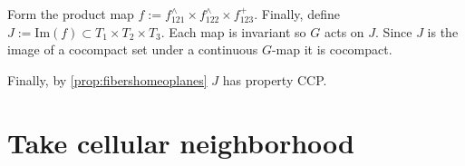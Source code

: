 \documentclass[12pt,parskip=full]{report}
\theoremstyle{plain}
\theoremstyle{definition}
\begin{document}
        Form the product map \(f:= f_{121}^{\wedge} \times f_{122}^{\wedge} \times f_{123}^{+}\). Finally, define \(J := \text{Im}(f) \subset T_1\times T_2\times T_3\). Each map is invariant so \(G\) acts on \(J\). Since \(J\) is the image of a cocompact set under a continuous \(G\)-map it is cocompact. 
        
        Finally, by \ref{prop:fibershomeoplanes} \(J\) has property CCP.
    

    
        
        
        
        
        
        
        
        
        
    \section{Take cellular neighborhood}
        
\end{document}
